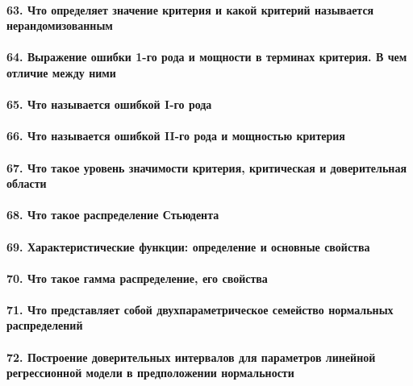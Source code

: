 \documentclass[titlepage]{article}
\begin{document}
\paragraph{63. Что определяет значение критерия и какой критерий называется нерандомизованным}

\paragraph{64. Выражение ошибки 1-го рода и мощности в терминах критерия. В чем отличие между ними}

\paragraph{65. Что называется ошибкой I-го рода}

\paragraph{66. Что называется ошибкой II-го рода и мощностью критерия}

\paragraph{67. Что такое уровень значимости критерия, критическая и доверительная области}

\paragraph{68. Что такое распределение Стьюдента}

\paragraph{69. Характеристические функции: определение и основные свойства}

\paragraph{70. Что такое гамма распределение, его свойства}

\paragraph{71. Что представляет собой двухпараметрическое семейство нормальных распределений}

\paragraph{72. Построение доверительных интервалов для параметров линейной регрессионной модели в предположении нормальности}
\end{document}
